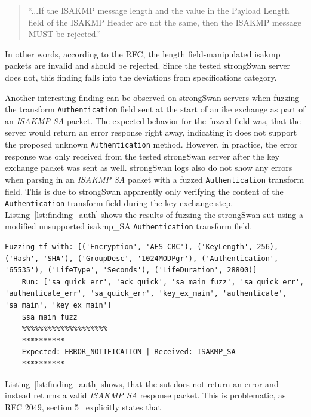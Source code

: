 \begin{quotation}
	``...If the ISAKMP message length and the value in
	the Payload Length field of the ISAKMP Header are not the same, then
	the ISAKMP message MUST be rejected.''
\end{quotation}

In other words, according to the RFC, the length field-manipulated \ac{isakmp} packets are invalid and should be rejected. Since the tested strongSwan server does not, this finding falls into the deviations from specifications category. 

Another interesting finding can be observed on strongSwan servers when fuzzing the transform \texttt{Authentication} field sent at the start of an \ac{ike} exchange as part of an \emph{ISAKMP SA} packet. The expected behavior for the fuzzed field was, that the server would return an error response right away, indicating it does not support the proposed unknown \texttt{Authentication} method. However, in practice, the error response was only received from the tested strongSwan server after the key exchange packet was sent as well. strongSwan logs also do not show any errors when parsing in an \emph{ISAKMP SA} packet with a fuzzed \texttt{Authentication} transform field. This is due to strongSwan apparently only verifying the content of the \texttt{Authentication} transform field during the key-exchange step. Listing~\ref{lst:finding_auth} shows the results of fuzzing the strongSwan \ac{sut} using a modified unsupported \ac{isakmp}\_SA \texttt{Authentication} transform field. 

\begin{lstlisting}[float=h, caption=Finding showing the Authentication field not being validated, label=lst:finding_auth]
	Fuzzing tf with: [('Encryption', 'AES-CBC'), ('KeyLength', 256), ('Hash', 'SHA'), ('GroupDesc', '1024MODPgr'), ('Authentication', '65535'), ('LifeType', 'Seconds'), ('LifeDuration', 28800)]
	Run: ['sa_quick_err', 'ack_quick', 'sa_main_fuzz', 'sa_quick_err', 'authenticate_err', 'sa_quick_err', 'key_ex_main', 'authenticate', 'sa_main', 'key_ex_main']
	$sa_main_fuzz
	%%%%%%%%%%%%%%%%%%%%
	**********
	Expected: ERROR_NOTIFICATION | Received: ISAKMP_SA
	**********
\end{lstlisting}

Listing~\ref{lst:finding_auth} shows, that the \ac{sut} does not return an error and instead returns a valid \emph{ISAKMP SA} response packet. This is problematic, as RFC 2049, section 5~\cite{rfc:ikev1} explicitly states that 

